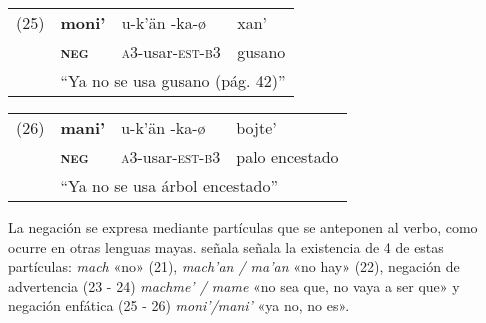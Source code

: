 {%
\begin{tabular}{llll}
(25) & \textbf{moni'} & u-k'än -ka-ø & xan' \\
& \textsc{\textbf{neg}} & \textsc{a3}-usar-\textsc{est-b3} & gusano \\
& \multicolumn{3}{l}{``Ya no se usa gusano (pág. 42)''}\\
\end{tabular} \vspace{0.3cm}

\begin{tabular}{llll}
(26) & \textbf{mani'} & u-k'än -ka-ø & bojte' \\
& \textsc{\textbf{neg}} & \textsc{a3}-usar-\textsc{est-b3} & palo encestado \\
 & \multicolumn{3}{l}{``Ya no se usa árbol encestado''} \\
\end{tabular} \vspace{0.5cm}
}

La negación se expresa mediante partículas que se anteponen al verbo, como ocurre en otras lenguas mayas. \textcolor{MidnightBlue}{\citet{ChontalTabasco}} señala señala la existencia de 4 de estas partículas: \textit{mach} «no» (21), \textit{mach'an / ma'an} «no hay» (22), negación de advertencia (23 - 24) \textit{machme' / mame} «no sea que, no vaya a ser que» y negación enfática (25 - 26) \textit{moni'/mani'} «ya no, no es».